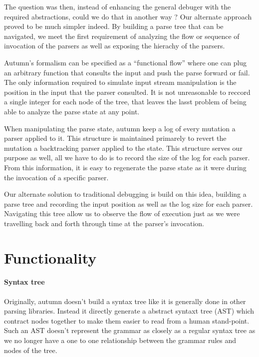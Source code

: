 \bigskip

The question was then, instead of enhancing the general debuger with the required abstractions, could we do that in another way ? Our alternate approach proved to be much simpler indeed. By building a parse tree that can be navigated, we meet the first requirement of analyzing the flow or sequence of invocation of the parsers as well as exposing the hierachy of the parsers.

Autumn's formalism can be specified as a ``functional flow'' where one can plug an arbitrary function that consults the input and push the parse forward or fail. The only information required to simulate input stream manipulation is the position in the input that the parser consulted. It is not unreasonable to reccord a single integer for each node of the tree, that leaves the lasst problem of being able to analyze the parse state at any point.

\bigskip

When manipulating the parse state, autumn keep a log of every mutation a parser applied to it. This structure is maintained primarely to revert the mutation a backtracking parser applied to the state. This structure serves our purpose as well, all we have to do is to record the size of the log for each parser. From this information, it is easy to regenerate the parse state as it were during the invocation of a specific parser.

\bigskip

Our alternate solution to traditional debugging is build on this idea, building a parse tree and recording the input position as well as the log size for each parser. Navigating this tree allow us to observe the flow of execution just as we were travelling back and forth through time at the parser's invocation. 
	
\section{Functionality}


	\paragraph{Syntax tree}
	Originally, autumn doesn't build a syntax tree like it is generally done in other parsing libraries. Instead it directly generate a abstract syntaxt tree (AST) which contract nodes together to make them easier to read from a human stand-point. Such an AST doesn't represent the grammar as closely as a regular syntax tree as we no longer have a one to one relationship between the grammar rules and nodes of the tree.

